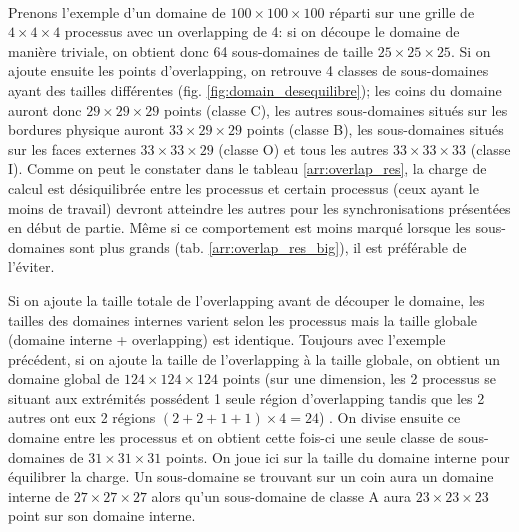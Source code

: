 \paragraph{}Prenons l'exemple d'un domaine de $100\times100\times100$ réparti sur une grille de $4\times4\times4$ processus avec un overlapping de 4: si on découpe le domaine de manière triviale, on obtient donc 64 sous-domaines de taille $25\times25\times25$. Si on ajoute ensuite les points d'overlapping, on retrouve 4 classes de sous-domaines ayant des tailles différentes (fig. \ref{fig:domain_desequilibre}); les coins du domaine auront donc $29\times29\times29$ points (classe C), les autres sous-domaines situés sur les bordures physique auront $33\times29\times29$ points (classe B), les sous-domaines situés sur les faces externes $33\times33\times29$ (classe O) et tous les autres $33\times33\times33$ (classe I). Comme on peut le constater dans le tableau \ref{arr:overlap_res}, la charge de calcul est désiquilibrée entre les processus et certain processus (ceux ayant le moins de travail) devront atteindre les autres pour les synchronisations présentées en début de partie. Même si ce comportement est moins marqué lorsque les sous-domaines sont plus grands (tab. \ref{arr:overlap_res_big}), il est préférable de l'éviter.
  
Si on ajoute la taille totale de l'overlapping avant de découper le domaine, les tailles des domaines internes varient selon les processus mais la taille globale (domaine interne + overlapping) est identique. Toujours avec l'exemple précédent, si on ajoute la taille de l'overlapping à la taille globale, on obtient un domaine global de $124\times124\times124$ points (sur une dimension, les 2 processus se situant aux extrémités possédent 1 seule région d'overlapping tandis que les 2 autres ont eux 2 régions $(2+2+1+1)\times4=24$) . On divise ensuite ce domaine entre les processus et on obtient cette fois-ci une seule classe de sous-domaines de $31\times31\times31$ points. On joue ici sur la taille du domaine interne pour équilibrer la charge. Un sous-domaine se trouvant sur un coin aura un domaine interne de $27\times27\times27$ alors qu'un sous-domaine de classe A aura $23\times23\times23$ point sur son domaine interne.


